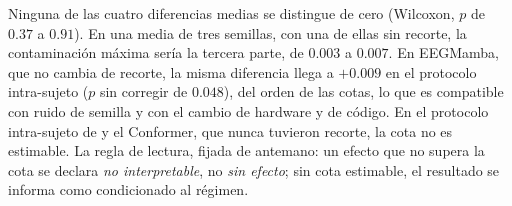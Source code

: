Ninguna de las cuatro diferencias medias se distingue de cero (Wilcoxon, $p$ de $0.37$ a $0.91$). En una
media de tres semillas, con una de ellas sin recorte, la contaminación máxima sería la tercera parte, de
$0.003$ a $0.007$. En EEGMamba, que no cambia de recorte, la misma diferencia llega a $+0.009$ en el
protocolo intra-sujeto ($p$ sin corregir de $0.048$), del orden de las cotas, lo que es compatible con
ruido de semilla y con el cambio de hardware y de código. En el protocolo intra-sujeto de \eegnet{} y el
Conformer, que nunca tuvieron recorte, la cota no es estimable. La regla de lectura, fijada de antemano:
un efecto que no supera la cota se declara \emph{no interpretable}, no \emph{sin efecto}; sin cota
estimable, el resultado se informa como condicionado al régimen.

